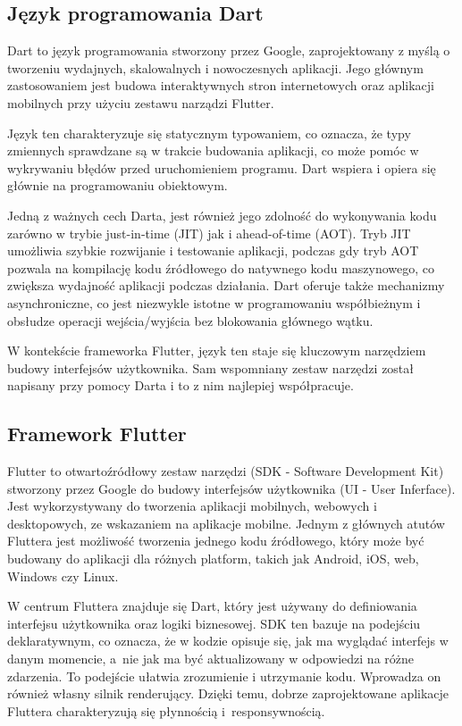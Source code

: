 \documentclass[12pt,twoside]{article}
\begin{document}
\subsection{Język programowania Dart}
Dart to język programowania stworzony przez Google, zaprojektowany z myślą o tworzeniu wydajnych, skalowalnych i nowoczesnych aplikacji. Jego głównym zastosowaniem jest budowa interaktywnych stron internetowych oraz aplikacji mobilnych przy użyciu zestawu narządzi Flutter.

Język ten charakteryzuje się statycznym typowaniem, co oznacza, że typy zmiennych sprawdzane są w trakcie budowania aplikacji, co może pomóc w wykrywaniu błędów przed uruchomieniem programu. Dart wspiera i opiera się głównie na programowaniu obiektowym.

Jedną z ważnych cech Darta, jest również jego zdolność do wykonywania kodu zarówno w trybie just-in-time (JIT) jak i ahead-of-time (AOT). Tryb JIT umożliwia szybkie rozwijanie i testowanie aplikacji, podczas gdy tryb AOT pozwala na kompilację
kodu źródłowego do natywnego kodu maszynowego, co zwiększa wydajność aplikacji podczas działania. Dart oferuje także mechanizmy asynchroniczne, co jest niezwykle istotne w programowaniu współbieżnym i obsłudze operacji wejścia/wyjścia bez blokowania głównego wątku.\cite{dartInfo}

W kontekście frameworka Flutter, język ten staje się kluczowym narzędziem budowy interfejsów użytkownika. Sam wspomniany zestaw narzędzi został napisany przy pomocy Darta i to z nim najlepiej współpracuje.
\subsection{Framework Flutter}
Flutter to otwartoźródłowy zestaw narzędzi (SDK - Software Development Kit) stworzony przez Google do budowy interfejsów użytkownika (UI - User Inferface). Jest wykorzystywany do tworzenia aplikacji mobilnych, webowych i desktopowych, ze wskazaniem na aplikacje mobilne. Jednym z głównych atutów Fluttera jest możliwość tworzenia jednego kodu źródłowego, który może być budowany do aplikacji dla różnych platform, takich jak Android, iOS, web, Windows czy Linux.

W centrum Fluttera znajduje się Dart, który jest używany do definiowania interfejsu użytkownika oraz logiki biznesowej.
SDK ten bazuje na podejściu deklaratywnym, co oznacza, że w kodzie opisuje się, jak ma wyglądać interfejs w danym momencie, a~nie jak ma być aktualizowany w odpowiedzi na różne zdarzenia. To podejście ułatwia zrozumienie i utrzymanie kodu.
Wprowadza on również własny silnik renderujący. Dzięki temu, dobrze zaprojektowane aplikacje Fluttera charakteryzują się płynnością i~responsywnością.
\end{document}
